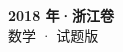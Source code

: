 \documentclass[zihao=-4, a4paper]{ctexart}
\begin{document}
\begin{center}
  {\Large\bfseries 2018 年·浙江卷}\\[4pt]
  {\large 数学 · 试题版}
\end{center}
\medskip
{}

\end{document}
